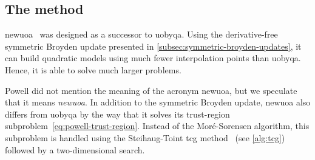 \subsection{The  method}
\label{subsec:newuoa}

\Gls{newuoa}~\cite{Powell_2006} was designed as a successor to \gls{uobyqa}.
Using the derivative-free symmetric Broyden update presented in \cref{subsec:symmetric-broyden-updates}, it can build quadratic models using much fewer interpolation points than \gls{uobyqa}.
Hence, it is able to solve much larger problems.

Powell did not mention the meaning of the acronym \gls{newuoa}, but we speculate that it means \emph{\glsdesc{newuoa}}.
In addition to the symmetric Broyden update, \gls{newuoa} also differs from \gls{uobyqa} by the way that it solves its trust-region subproblem~\cref{eq:powell-trust-region}.
Instead of the Mor{\'{e}}-Sorensen algorithm, this subproblem is handled using the Steihaug-Toint \gls{tcg} method~\cite{Steihaug_1983,Toint_1981} (see \cref{alg:tcg}) followed by a two-dimensional search.

